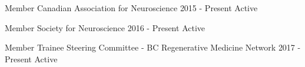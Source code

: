 

\begin{cvhonors}

  \cvhonor
    {Member} %
    {Canadian Association for Neuroscience} %
    {2015 - Present} %
    {Active} %

  \cvhonor
    {Member} %
    {Society for Neuroscience} %
    {2016 - Present} %
    {Active} %

  \cvhonor
    {Member} %
    {Trainee Steering Committee - BC Regenerative Medicine Network} %
    {2017 - Present} %
    {Active} %



\end{cvhonors}
